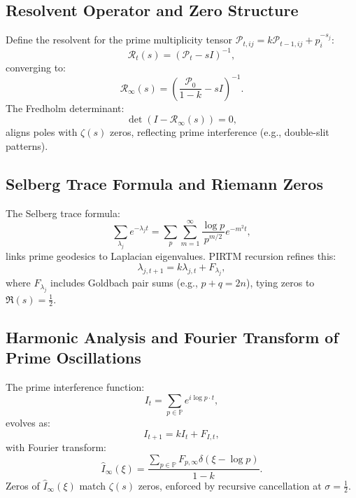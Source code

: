 \documentclass[11pt]{article}
\theoremstyle{plain}
\begin{document}
\subsection{Resolvent Operator and Zero Structure}
Define the resolvent for the prime multiplicity tensor \( \mathcal{P}_{t,ij} = k \mathcal{P}_{t-1,ij} + p_i^{-s_j} \):
\begin{equation}
    \mathcal{R}_t(s) = (\mathcal{P}_t - s I)^{-1},
\end{equation}
converging to:
\begin{equation}
    \mathcal{R}_\infty(s) = \left( \frac{\mathcal{P}_0}{1 - k} - s I \right)^{-1}.
\end{equation}
The Fredholm determinant:
\begin{equation}
    \det(I - \mathcal{R}_\infty(s)) = 0,
\end{equation}
aligns poles with \( \zeta(s) \) zeros, reflecting prime interference (e.g., double-slit patterns).

\subsection{Selberg Trace Formula and Riemann Zeros}
The Selberg trace formula:
\begin{equation}
    \sum_{\lambda_j} e^{-\lambda_j t} = \sum_{p} \sum_{m=1}^{\infty} \frac{\log p}{p^{m/2}} e^{-m^2 t},
\end{equation}
links prime geodesics to Laplacian eigenvalues. PIRTM recursion refines this:
\begin{equation}
    \lambda_{j,t+1} = k \lambda_{j,t} + F_{\lambda_j},
\end{equation}
where \( F_{\lambda_j} \) includes Goldbach pair sums (e.g., \( p + q = 2n \)), tying zeros to \( \Re(s) = \frac{1}{2} \).

\subsection{Harmonic Analysis and Fourier Transform of Prime Oscillations}
The prime interference function:
\begin{equation}
    I_t = \sum_{p \in \mathbb{P}} e^{i \log p \cdot t},
\end{equation}
evolves as:
\begin{equation}
    I_{t+1} = k I_t + F_{I,t},
\end{equation}
with Fourier transform:
\begin{equation}
    \hat{I}_\infty(\xi) = \frac{\sum_{p \in \mathbb{P}} F_{p,\infty} \delta(\xi - \log p)}{1 - k}.
\end{equation}
Zeros of \( \hat{I}_\infty(\xi) \) match \( \zeta(s) \) zeros, enforced by recursive cancellation at \( \sigma = \frac{1}{2} \).
\end{document}
